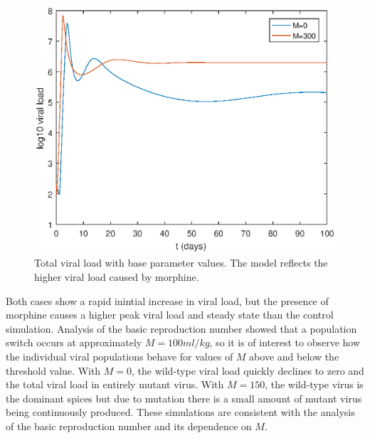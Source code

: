 \documentclass[11pt, oneside]{article}    %
\begin{document}
\begin{figure}[H]
\centering
\includegraphics[scale=0.5]{viral_load_base.eps}
\caption{Total viral load with base parameter values. The model reflects the higher viral load caused by morphine.}
\end{figure}

Both cases show a rapid inintial increase in viral load, but the presence of morphine causes a higher peak viral load and steady state than the control simulation. Analysis of the basic reproduction number showed that a population switch occurs at approximately $M=100ml/kg$, so it is of interest to observe how the individual viral populations behave for values of $M$ above and below the threshold value. With $M=0$, the wild-type viral load quickly declines to zero and the total viral load in entirely mutant virus. With $M=150$, the wild-type virus is the dominant spices but due to mutation there is a small amount of mutant virus being continuously produced. These simulations are consistent with the analysis of the basic reproduction number and its dependence on $M$.
\end{document}
